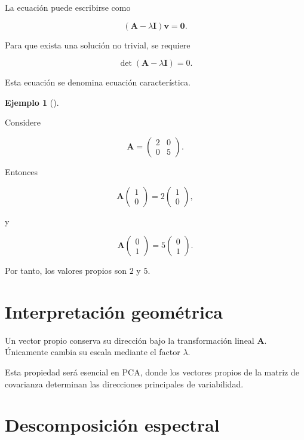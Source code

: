 \documentclass[
  spanish,
  11pt,
  letterpaper,
  DIV=11,
  numbers=noendperiod]{scrreprt}
\theoremstyle{definition}
\theoremstyle{plain}
\theoremstyle{definition}
\newtheorem{example}{Ejemplo}[chapter]
\theoremstyle{remark}
\begin{document}
La ecuación puede escribirse como

\[
(\mathbf{A}-\lambda\mathbf{I})\mathbf{v}
=
\mathbf{0}.
\]

Para que exista una solución no trivial, se requiere

\[
\det(\mathbf{A}-\lambda\mathbf{I})=0.
\]

Esta ecuación se denomina ecuación característica.

\begin{example}[]\protect\hypertarget{exm-valores-propios}{}\label{exm-valores-propios}

Considere

\[
\mathbf{A}
=
\begin{pmatrix}
2 & 0\\
0 & 5
\end{pmatrix}.
\]

Entonces

\[
\mathbf{A}
\begin{pmatrix}
1\\
0
\end{pmatrix}
=
2
\begin{pmatrix}
1\\
0
\end{pmatrix},
\]

y

\[
\mathbf{A}
\begin{pmatrix}
0\\
1
\end{pmatrix}
=
5
\begin{pmatrix}
0\\
1
\end{pmatrix}.
\]

Por tanto, los valores propios son \(2\) y \(5\).

\end{example}

\section{Interpretación
geométrica}\label{interpretaciuxf3n-geomuxe9trica}

Un vector propio conserva su dirección bajo la transformación lineal
\(\mathbf{A}\). Únicamente cambia su escala mediante el factor
\(\lambda\).

Esta propiedad será esencial en PCA, donde los vectores propios de la
matriz de covarianza determinan las direcciones principales de
variabilidad.

\section{Descomposición espectral}\label{descomposiciuxf3n-espectral}
\end{document}
